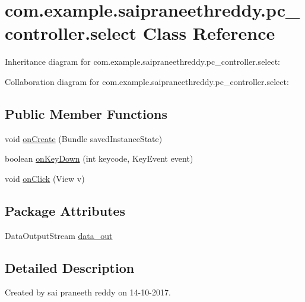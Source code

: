 \hypertarget{classcom_1_1example_1_1saipraneethreddy_1_1pc__controller_1_1select}{}\section{com.\+example.\+saipraneethreddy.\+pc\+\_\+controller.\+select Class Reference}
\label{classcom_1_1example_1_1saipraneethreddy_1_1pc__controller_1_1select}


Inheritance diagram for com.\+example.\+saipraneethreddy.\+pc\+\_\+controller.\+select\+:


Collaboration diagram for com.\+example.\+saipraneethreddy.\+pc\+\_\+controller.\+select\+:
\subsection*{Public Member Functions}
\begin{DoxyCompactItemize}
\item 
void \hyperlink{classcom_1_1example_1_1saipraneethreddy_1_1pc__controller_1_1select_a0a83c9f43bb5badcfb916754c0137b40}{on\+Create} (Bundle saved\+Instance\+State)
\item 
boolean \hyperlink{classcom_1_1example_1_1saipraneethreddy_1_1pc__controller_1_1select_ad3495e9e3a4487e975d253164922be4c}{on\+Key\+Down} (int keycode, Key\+Event event)
\item 
void \hyperlink{classcom_1_1example_1_1saipraneethreddy_1_1pc__controller_1_1select_a0ae67912bbf087d521fda4453eb78dc8}{on\+Click} (View v)
\end{DoxyCompactItemize}
\subsection*{Package Attributes}
\begin{DoxyCompactItemize}
\item 
Data\+Output\+Stream \hyperlink{classcom_1_1example_1_1saipraneethreddy_1_1pc__controller_1_1select_a8fb92144ad61d2832ebaf75c7bd726d9}{data\+\_\+out}
\end{DoxyCompactItemize}


\subsection{Detailed Description}
Created by sai praneeth reddy on 14-\/10-\/2017. 


